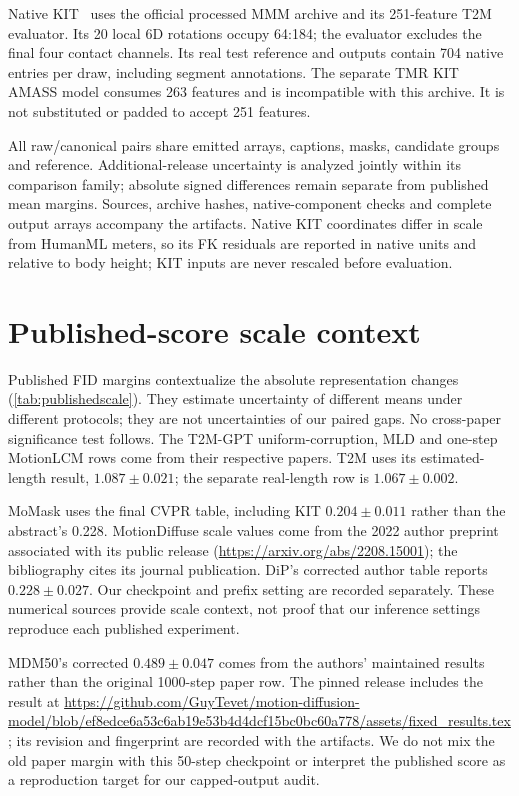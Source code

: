 \documentclass[10pt,twocolumn,letterpaper]{article}
\begin{document}
Native KIT~\cite{kit2016} uses the official processed MMM archive and its 251-feature T2M evaluator. Its 20 local 6D rotations occupy 64:184; the evaluator excludes the final four contact channels. Its real test reference and outputs contain 704 native entries per draw, including segment annotations. The separate TMR KIT AMASS model consumes 263 features and is incompatible with this archive. It is not substituted or padded to accept 251 features.

All raw/canonical pairs share emitted arrays, captions, masks, candidate groups and reference. Additional-release uncertainty is analyzed jointly within its comparison family; absolute signed differences remain separate from published mean margins. Sources, archive hashes, native-component checks and complete output arrays accompany the artifacts. Native KIT coordinates differ in scale from HumanML meters, so its FK residuals are reported in native units and relative to body height; KIT inputs are never rescaled before evaluation.


\section{Published-score scale context}

Published FID margins contextualize the absolute representation changes (\cref{tab:publishedscale}). They estimate uncertainty of different means under different protocols; they are not uncertainties of our paired gaps. No cross-paper significance test follows. The T2M-GPT uniform-corruption, MLD and one-step MotionLCM rows come from their respective papers. T2M uses its estimated-length result, $1.087\pm0.021$; the separate real-length row is $1.067\pm0.002$.

MoMask uses the final CVPR table, including KIT $0.204\pm0.011$ rather than the abstract's 0.228. MotionDiffuse scale values come from the 2022 author preprint associated with its public release (\url{https://arxiv.org/abs/2208.15001}); the bibliography cites its journal publication. DiP's corrected author table reports $0.228\pm0.027$. Our checkpoint and prefix setting are recorded separately. These numerical sources provide scale context, not proof that our inference settings reproduce each published experiment.

MDM50's corrected $0.489\pm0.047$ comes from the authors' maintained results rather than the original 1000-step paper row. The pinned release includes the result at \url{https://github.com/GuyTevet/motion-diffusion-model/blob/ef8edce6a53c6ab19e53b4d4dcf15bc0bc60a778/assets/fixed_results.tex}; its revision and fingerprint are recorded with the artifacts. We do not mix the old paper margin with this 50-step checkpoint or interpret the published score as a reproduction target for our capped-output audit.
\end{document}
